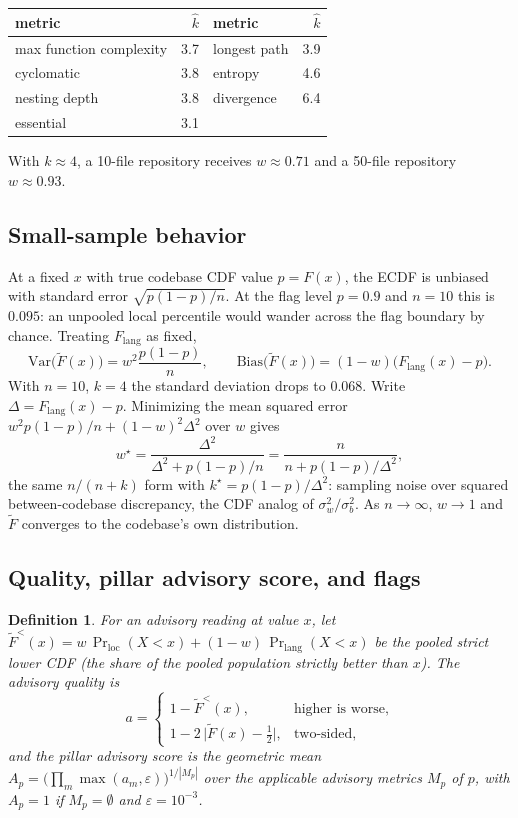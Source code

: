 \documentclass[11pt]{article}
\newtheorem{definition}{Definition}
\theoremstyle{remark}
\newcommand{\Flang}{F_{\mathrm{lang}}}
\newcommand{\Ft}{\tilde F}
\begin{document}
\begin{center}
\begin{tabular}{lr@{\qquad}lr}
\toprule
metric & $\hat k$ & metric & $\hat k$ \\
\midrule
max function complexity & 3.7 & longest path & 3.9 \\
cyclomatic & 3.8 & entropy & 4.6 \\
nesting depth & 3.8 & divergence & 6.4 \\
essential & 3.1 & & \\
\bottomrule
\end{tabular}
\end{center}

With $k \approx 4$, a 10-file repository receives $w \approx 0.71$ and a 50-file
repository $w \approx 0.93$.

\subsection{Small-sample behavior}

At a fixed $x$ with true codebase CDF value $p = F(x)$, the ECDF is unbiased with
standard error $\sqrt{p(1-p)/n}$. At the flag level $p = 0.9$ and $n = 10$ this
is $0.095$: an unpooled local percentile would wander across the flag boundary
by chance. Treating $\Flang$ as fixed,
\[
\mathrm{Var}\bigl(\Ft(x)\bigr) = w^2 \frac{p(1-p)}{n}, \qquad
\mathrm{Bias}\bigl(\Ft(x)\bigr) = (1 - w)\bigl(\Flang(x) - p\bigr).
\]
With $n = 10$, $k = 4$ the standard deviation drops to $0.068$. Write
$\Delta = \Flang(x) - p$. Minimizing the mean squared error
$w^2 p(1-p)/n + (1-w)^2 \Delta^2$ over $w$ gives
\[
w^\star = \frac{\Delta^2}{\Delta^2 + p(1-p)/n} = \frac{n}{n + p(1-p)/\Delta^2},
\]
the same $n/(n+k)$ form with $k^\star = p(1-p)/\Delta^2$: sampling noise over
squared between-codebase discrepancy, the CDF analog of
$\sigma_w^2/\sigma_b^2$. As $n \to \infty$, $w \to 1$ and $\Ft$ converges to the
codebase's own distribution.

\subsection{Quality, pillar advisory score, and flags}

\begin{definition}
For an advisory reading at value $x$, let
$\Ft^{<}(x) = w\,\Pr_{\mathrm{loc}}(X < x) + (1-w)\,\Pr_{\mathrm{lang}}(X < x)$
be the pooled \emph{strict} lower CDF (the share of the pooled population
strictly better than $x$). The advisory quality is
\[
a = \begin{cases}
1 - \Ft^{<}(x), & \text{higher is worse},\\
1 - 2\,\bigl|\Ft(x) - \tfrac12\bigr|, & \text{two-sided},
\end{cases}
\]
and the pillar advisory score is the geometric mean
$A_p = \bigl(\prod_{m} \max(a_m, \varepsilon)\bigr)^{1/|M_p|}$ over the
applicable advisory metrics $M_p$ of $p$, with $A_p = 1$ if $M_p = \emptyset$ and
$\varepsilon = 10^{-3}$.
\end{definition}
\end{document}
